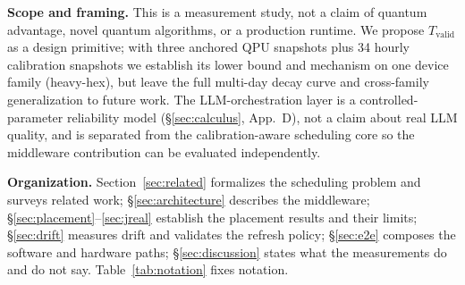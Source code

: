 \documentclass[journal,10pt,twocolumn]{IEEEtran}
\begin{document}
\noindent\textbf{Scope and framing.} This is a measurement study, not a claim of quantum advantage,
novel quantum algorithms, or a production runtime. We propose $T_{\mathrm{valid}}$ as a design primitive;
with three anchored QPU snapshots plus 34 hourly calibration snapshots we establish its lower bound and
mechanism on one device family (heavy-hex), but leave the full multi-day decay curve and cross-family
generalization to future work. The LLM-orchestration layer is a controlled-parameter reliability model
(\S\ref{sec:calculus}, App.~D), not a claim about real LLM quality, and is separated from the
calibration-aware scheduling core so the middleware contribution can be evaluated independently.

\noindent\textbf{Organization.} Section~\ref{sec:related} formalizes the scheduling problem and surveys related
work; \S\ref{sec:architecture} describes the middleware; \S\ref{sec:placement}--\ref{sec:jreal} establish the
placement results and their limits; \S\ref{sec:drift} measures drift and validates the refresh policy;
\S\ref{sec:e2e} composes the software and hardware paths; \S\ref{sec:discussion} states what the measurements do
and do not say. Table~\ref{tab:notation} fixes notation.
\end{document}
